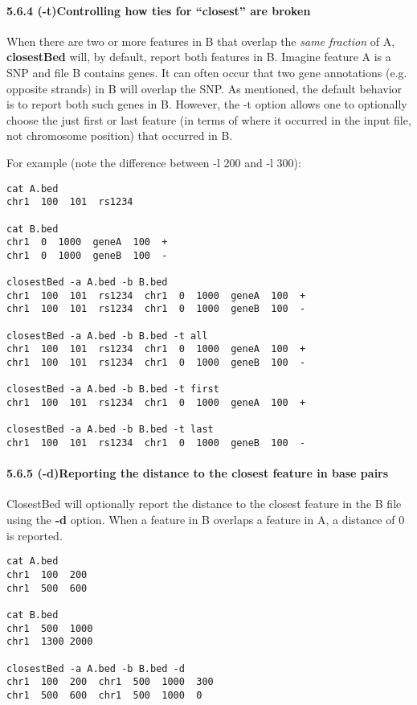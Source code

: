 \documentclass[letterpaper,10pt,english]{sphinxmanual}
\begin{document}
\paragraph{5.6.4 (-t)Controlling how ties for ``closest'' are broken}
\label{content/closestBed:t-controlling-how-ties-for-closest-are-broken}
When there are two or more features in B that overlap the \emph{same fraction} of A, \textbf{closestBed} will, by
default, report both features in B. Imagine feature A is a SNP and file B contains genes. It can often
occur that two gene annotations (e.g. opposite strands) in B will overlap the SNP. As mentioned, the
default behavior is to report both such genes in B. However, the -t option allows one to optionally
choose the just first or last feature (in terms of where it occurred in the input file, not chromosome
position) that occurred in B.

For example (note the difference between -l 200 and -l 300):

\begin{Verbatim}[commandchars=\\\{\}]
cat A.bed
chr1  100  101  rs1234

cat B.bed
chr1  0  1000  geneA  100  +
chr1  0  1000  geneB  100  -

closestBed -a A.bed -b B.bed
chr1  100  101  rs1234  chr1  0  1000  geneA  100  +
chr1  100  101  rs1234  chr1  0  1000  geneB  100  -

closestBed -a A.bed -b B.bed -t all
chr1  100  101  rs1234  chr1  0  1000  geneA  100  +
chr1  100  101  rs1234  chr1  0  1000  geneB  100  -

closestBed -a A.bed -b B.bed -t first
chr1  100  101  rs1234  chr1  0  1000  geneA  100  +

closestBed -a A.bed -b B.bed -t last
chr1  100  101  rs1234  chr1  0  1000  geneB  100  -
\end{Verbatim}


\paragraph{5.6.5 (-d)Reporting the distance to the closest feature in base pairs}
\label{content/closestBed:d-reporting-the-distance-to-the-closest-feature-in-base-pairs}
ClosestBed will optionally report the distance to the closest feature in the B file using the \textbf{-d} option.
When a feature in B overlaps a feature in A, a distance of 0 is reported.

\begin{Verbatim}[commandchars=\\\{\}]
cat A.bed
chr1  100  200
chr1  500  600

cat B.bed
chr1  500  1000
chr1  1300 2000

closestBed -a A.bed -b B.bed -d
chr1  100  200  chr1  500  1000  300
chr1  500  600  chr1  500  1000  0
\end{Verbatim}
\end{document}
